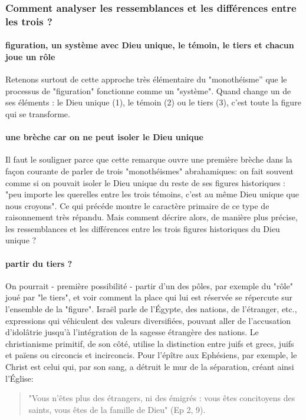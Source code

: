 \subsubsection{Comment analyser les ressemblances et les différences entre les trois ?}
 
 
\paragraph{figuration, un système avec Dieu unique, le témoin, le tiers et chacun joue un rôle}
Retenons surtout de cette approche très élémentaire du "monothéisme” que le processus de "figuration" fonctionne comme un "système". Quand change un de ses éléments : le Dieu unique (1), le témoin (2) ou le tiers (3), c’est toute la figure qui se transforme. 
\paragraph{une brèche car on ne peut isoler le Dieu unique}
Il faut le souligner parce que cette remarque ouvre une première brèche dans la façon courante de parler de trois "monothéismes" abrahamiques: on fait souvent comme si on pouvait isoler le Dieu unique du reste de ses figures historiques : "peu importe les querelles entre les trois témoins, c'est au même Dieu unique que nous croyons". Ce qui précéde montre le caractère primaire de ce type de raisonnement très répandu. Mais comment décrire alors, de manière plus précise, les ressemblances et les différences entre les trois figures historiques du Dieu unique ?

\paragraph{partir du tiers ?}
On pourrait - première possibilité - partir d'un des pôles, par exemple du "rôle" joué par "le tiers", et voir comment la place qui lui est réservée se répercute sur l'ensemble de la "figure". Israël parle de l'Égypte, des nations, de l'étranger, etc., expressions qui véhiculent des valeurs diversifiées, pouvant aller de l'accusation d'idolâtrie jusqu'à l'intégration de la sagesse étrangère des nations. Le christianisme primitif, de son côté, utilise la distinction entre juifs et grecs, juifs et païens ou circoncis et incirconcis. Pour l'épître aux Ephésiens, par exemple, le Christ est celui qui, par son sang, a détruit le mur de la séparation, créant ainsi l'Église: \begin{quote}
    "Vous n'êtes plus des étrangers, ni des émigrés : vous êtes concitoyens des saints, vous êtes de la famille de Dieu" (Ep 2, 9).
\end{quote}

